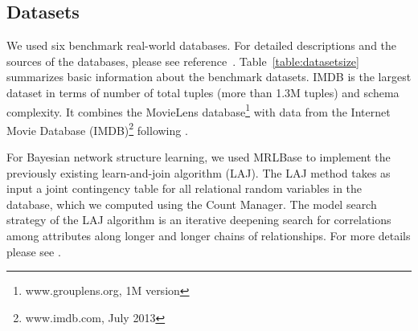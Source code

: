 \documentclass{acm_proc_article-sp}
\begin{document}
\subsection{Datasets}
We used six benchmark real-world databases. For detailed descriptions and  the sources of the databases, please see reference~\cite{Schulte2012}. Table~\ref{table:datasetsize} summarizes basic information about the benchmark datasets.  
IMDB is the largest dataset in terms of number of total tuples (more than 1.3M tuples) and schema complexity. %
It combines the MovieLens database\footnote{www.grouplens.org, 1M version} with data from the Internet Movie Database (IMDB)\footnote{www.imdb.com, July 2013} following \cite{Peralta2007}. 

For Bayesian network structure learning, we used MRLBase to implement the previously existing learn-and-join algorithm (LAJ). The LAJ method takes as input a joint contingency table for all relational random variables in the  database, which we computed using the Count Manager. The model search strategy of the LAJ algorithm is an iterative deepening search for correlations among attributes along longer and longer chains of relationships. For more details please see \cite{Schulte2012}. 
\end{document}
